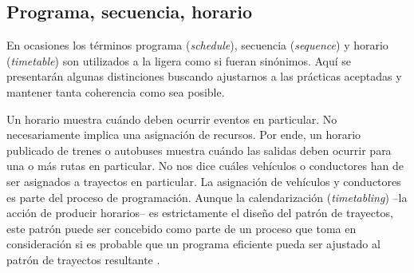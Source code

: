 \documentclass[draft,12pt,headsepline,footsepline,paper=letter]{scrreprt}
\begin{document}
\subsection{Programa, secuencia, horario}
\label{sub:programa_secuencia_horario}

En ocasiones los términos programa (\textit{schedule}), secuencia (\textit{sequence}) y horario (\textit{timetable}) son utilizados a la ligera como si fueran sinónimos. Aquí se presentarán algunas distinciones buscando ajustarnos a las prácticas aceptadas y mantener tanta coherencia como sea posible.

Un horario muestra cuándo deben ocurrir eventos en particular. No necesariamente implica una asignación de recursos. Por ende, un horario publicado de trenes o autobuses muestra cuándo las salidas deben ocurrir para una o más rutas en particular. No nos dice cuáles vehículos o conductores han de ser asignados a trayectos en particular. La asignación de vehículos y conductores es parte del proceso de programación. Aunque la calendarización (\textit{timetabling}) –la acción de producir horarios– es estrictamente el diseño del patrón de trayectos, este patrón puede ser concebido como parte de un proceso que toma en consideración si es probable que un programa eficiente pueda ser ajustado al patrón de trayectos resultante \cite[p.~48]{wren95scheduling-timetabling}.

\end{document}
